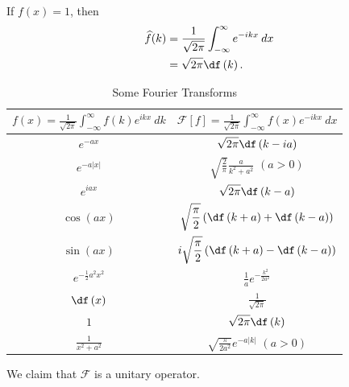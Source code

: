 \documentclass[10pt]{mypackage}
\begin{document}
\begin{example}
  If $f(x) = 1$, then
  \begin{align*}
    \widehat{f}(k) &= \frac{1}{\sqrt{2\pi}}\int_{-\infty}^{\infty} e^{-ikx}\:dx\\
               &= \sqrt{2\pi}\df\left(k\right).
  \end{align*}
  
\end{example}

\begin{table}
  \centering
  \renewcommand{\arraystretch}{2}
  \begin{tabular}{c|c}
    $\displaystyle f(x) = \frac{1}{\sqrt{2\pi}}\int_{-\infty}^{\infty} f(k)e^{ikx}\:dk$ & $\displaystyle \mathcal{F}\left[f\right] = \frac{1}{\sqrt{2\pi}}\int_{-\infty}^{\infty} f(x)e^{-ikx}\:dx$\\
    \hline\hline
    $\displaystyle e^{-ax}$ & $\displaystyle \sqrt{2\pi}\df\left(k-ia\right)$\\
    $\displaystyle e^{-a|x|}$ & $\displaystyle \sqrt{\frac{2}{\pi}}\frac{a}{k^2 + a^2}$ $(a > 0)$\\
    $\displaystyle e^{iax}$ & $\displaystyle \sqrt{2\pi}\df\left(k-a\right)$\\
    $\displaystyle \cos\left(ax\right)$ & $\displaystyle \sqrt{\frac{\pi}{2}}\left(\df\left(k+a\right) + \df\left(k-a\right)\right)$\\
    $\displaystyle \sin\left(ax\right)$ & $\displaystyle i\sqrt{\frac{\pi}{2}}\left(\df\left(k+a\right) - \df\left(k-a\right)\right)$\\
    $\displaystyle e^{-\frac{1}{2}a^2x^2}$ & $\displaystyle \frac{1}{a}e^{-\frac{k^2}{2a^2}}$\\
    $\displaystyle \df\left(x\right)$ & $\displaystyle \frac{1}{\sqrt{2\pi}}$\\
    $1$ & $\displaystyle \sqrt{2\pi}\df\left(k\right)$\\
    $\displaystyle \frac{1}{x^2 + a^2}$ & $\displaystyle \sqrt{\frac{\pi}{2a^2}}e^{-a|k|}$ $(a > 0)$
  \end{tabular}
  \caption{Some Fourier Transforms}
\end{table}
We claim that $\mathcal{F}$ is a unitary operator.
\end{document}
